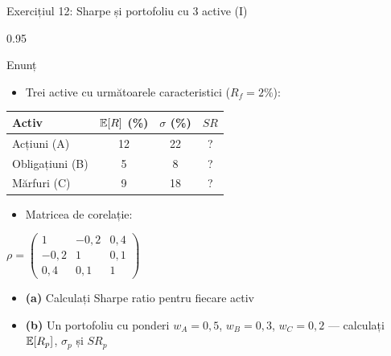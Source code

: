 \documentclass[9pt, aspectratio=169, t]{beamer}
\begin{document}
\begin{frame}[shrink=10]{Exercițiul 12: Sharpe și portofoliu cu 3 active (I)}
    \begin{cminipage}{0.95\textwidth}
    \begin{block}{Enunț}
    \begin{itemize}\setlength{\itemsep}{0pt}
        \item Trei active cu următoarele caracteristici ($R_f = 2\%$):
    \end{itemize}
    \begin{center}
    {\small\renewcommand{\arraystretch}{1.2}
    \begin{tabular}{lccc}
    \toprule
    \textbf{Activ} & $\mathbb{E}[R]$ (\%) & $\sigma$ (\%) & $SR$ \\
    \midrule
    Acțiuni (A) & 12 & 22 & ? \\
    Obligațiuni (B) & 5 & 8 & ? \\
    Mărfuri (C) & 9 & 18 & ? \\
    \bottomrule
    \end{tabular}}
    \end{center}
    \begin{itemize}\setlength{\itemsep}{0pt}
        \item Matricea de corelație:
    \end{itemize}
    \begin{center}
    {\small
    $\rho = \begin{pmatrix} 1 & -0{,}2 & 0{,}4 \\ -0{,}2 & 1 & 0{,}1 \\ 0{,}4 & 0{,}1 & 1 \end{pmatrix}$}
    \end{center}
    \begin{itemize}\setlength{\itemsep}{0pt}
        \item \textbf{(a)} Calculați Sharpe ratio pentru fiecare activ
        \item \textbf{(b)} Un portofoliu cu ponderi $w_A = 0{,}5$, $w_B = 0{,}3$, $w_C = 0{,}2$ --- calculați $\mathbb{E}[R_p]$, $\sigma_p$ și $SR_p$
    \end{itemize}
    \end{block}
    \end{cminipage}
\end{frame}
\end{document}
